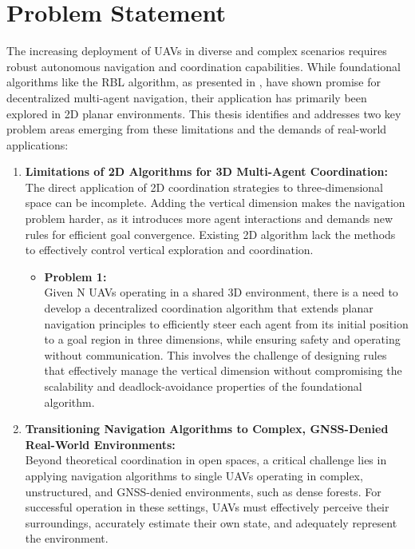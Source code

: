 \section{Problem Statement}
  The increasing deployment of \ac{UAV}s in diverse and complex scenarios requires robust autonomous navigation and coordination capabilities. 
  While foundational algorithms like the \ac{RBL} algorithm, as presented in \cite{rbl_paper}, have shown promise for decentralized multi-agent navigation, their application has primarily been explored in 2D planar environments. 
  This thesis identifies and addresses two key problem areas emerging from these limitations and the demands of real-world applications:
  \begin{enumerate}
    \item \textbf{Limitations of 2D Algorithms for 3D Multi-Agent Coordination: } \\
      The direct application of 2D coordination strategies to three-dimensional space can be incomplete. 
      Adding the vertical dimension makes the navigation problem harder, as it introduces more agent interactions and demands new rules for efficient goal convergence.
      Existing 2D algorithm lack the methods to effectively control vertical exploration and coordination.
      \begin{itemize}
        \item \textbf{Problem 1: } \\
        Given N \ac{UAV}s operating in a shared 3D environment, there is a need to develop a decentralized coordination algorithm that extends planar navigation principles to efficiently steer each agent from its initial position to a goal region in three dimensions, while ensuring safety and operating without communication. 
        This involves the challenge of designing rules that effectively manage the vertical dimension without compromising the scalability and deadlock-avoidance properties of the foundational algorithm.
      \end{itemize}
    \item \textbf{Transitioning Navigation Algorithms to Complex, GNSS-Denied Real-World Environments: } \\
      Beyond theoretical coordination in open spaces, a critical challenge lies in applying navigation algorithms to single \ac{UAV}s operating in complex, unstructured, and GNSS-denied environments, such as dense forests. 
      For successful operation in these settings, \ac{UAV}s must effectively perceive their surroundings, accurately estimate their own state, and adequately represent the environment.

\end{enumerate}
